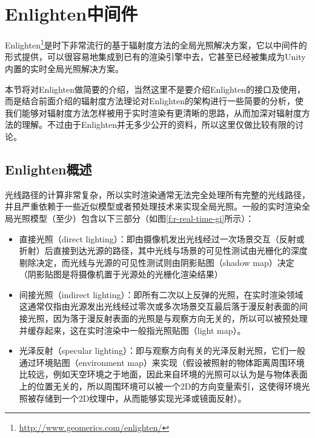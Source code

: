 \section{Enlighten中间件}\label{sec:r-enlighten}
Enlighten\footnote{\url{http://www.geomerics.com/enlighten/}}是时下非常流行的基于辐射度方法的全局光照解决方案，它以中间件的形式提供，可以很容易地集成到已有的渲染引擎中去，它甚至已经被集成为Unity内置的实时全局光照解决方案。

本节将对Enlighten做简要的介绍，当然这里不是要介绍Enlighten的接口及使用，而是结合前面介绍的辐射度方法理论对Enlighten的架构进行一些简要的分析，使我们能够对辐射度方法怎样被用于实时渲染有更清晰的思路，从而加深对辐射度方法的理解。不过由于Enlighten并无多少公开的资料，所以这里仅做比较有限的讨论。



\subsection{Enlighten概述}
光线路径的计算非常复杂，所以实时渲染通常无法完全处理所有完整的光线路径，并且严重依赖于一些近似模型或者预处理技术来实现全局光照。一般的实时渲染全局光照模型（至少）包含以下三部分（如图\ref{f:r-real-time-gi}所示）：

\begin{itemize}
	\item 直接光照（direct lighting）：即由摄像机发出光线经过一次场景交互（反射或折射）后直接到达光源的路径，其中光线与场景的可见性测试由光栅化的深度剔除决定，而光线与光源的可见性测试则由阴影贴图（shadow map）决定（阴影贴图是将摄像机置于光源处的光栅化渲染结果）
	\item 间接光照（indirect lighting）：即所有二次以上反弹的光照，在实时渲染领域这通常仅指由光源发出光线经过零次或多次场景交互最后落于漫反射表面的间接光照，因为落于漫反射表面的光照是与观察方向无关的，所以可以被预处理并缓存起来，这在实时渲染中一般指光照贴图（light map）。
	\item 光泽反射（specular lighting）：即与观察方向有关的光泽反射光照，它们一般通过环境贴图（environment map）来实现（假设被照射的物体距离周围环境比较远，例如天空环境之于地面，因此来自环境的光照可以认为是与物体表面上的位置无关的，所以周围环境可以被一个2D的方向变量索引，这使得环境光照被存储到一个2D纹理中，从而能够实现光泽或镜面反射）。
\end{itemize}

